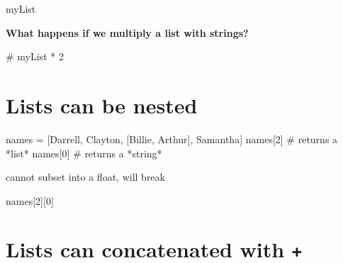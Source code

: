 \documentclass[
  letterpaper,
  DIV=11,
  numbers=noendperiod]{scrreprt}
\newenvironment{Shaded}{\begin{snugshade}}{\end{snugshade}}
\newcommand{\CommentTok}[1]{\textcolor[rgb]{0.37,0.37,0.37}{#1}}
\newcommand{\DecValTok}[1]{\textcolor[rgb]{0.68,0.00,0.00}{#1}}
\newcommand{\NormalTok}[1]{\textcolor[rgb]{0.00,0.23,0.31}{#1}}
\newcommand{\OperatorTok}[1]{\textcolor[rgb]{0.37,0.37,0.37}{#1}}
\newcommand{\StringTok}[1]{\textcolor[rgb]{0.13,0.47,0.30}{#1}}
\begin{document}
\begin{Shaded}
\begin{Highlighting}[]
\NormalTok{myList}
\end{Highlighting}
\end{Shaded}

\textbf{What happens if we multiply a list with strings?}

\begin{Shaded}
\begin{Highlighting}[]
\CommentTok{\# myList * 2}
\end{Highlighting}
\end{Shaded}

\hypertarget{lists-can-be-nested-1}{%
\section{Lists can be nested}\label{lists-can-be-nested-1}}

\begin{Shaded}
\begin{Highlighting}[]
\NormalTok{names }\OperatorTok{=}\NormalTok{ [}\StringTok{\textquotesingle{}Darrell\textquotesingle{}}\NormalTok{, }\StringTok{\textquotesingle{}Clayton\textquotesingle{}}\NormalTok{, [}\StringTok{\textquotesingle{}Billie\textquotesingle{}}\NormalTok{, }\StringTok{\textquotesingle{}Arthur\textquotesingle{}}\NormalTok{], }\StringTok{\textquotesingle{}Samantha\textquotesingle{}}\NormalTok{]}
\NormalTok{names[}\DecValTok{2}\NormalTok{] }\CommentTok{\# returns a *list*}
\NormalTok{names[}\DecValTok{0}\NormalTok{] }\CommentTok{\# returns a *string*}
\end{Highlighting}
\end{Shaded}

cannot subset into a float, will break

\begin{Shaded}
\begin{Highlighting}[]
\NormalTok{names[}\DecValTok{2}\NormalTok{][}\DecValTok{0}\NormalTok{]}
\end{Highlighting}
\end{Shaded}

\hypertarget{lists-can-concatenated-with-1}{%
\section{\texorpdfstring{Lists can concatenated with
\texttt{+}}{Lists can concatenated with +}}\label{lists-can-concatenated-with-1}}
\end{document}
